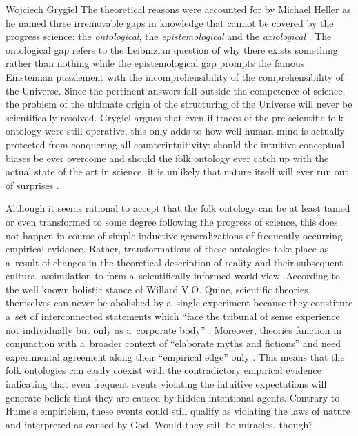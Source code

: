 \begin{artengenv}{Wojciech Grygiel}
The theoretical reasons were accounted for by Michael Heller as he named three irremovable gaps in knowledge that cannot be covered by the progress science: the \textit{ontological}, the \textit{epistemological} and the \textit{axiological}
\parencite[][pp.142–143]{heller_chaos_2003}. %
 The ontological gap refers to the Leibnizian question of why there exists something rather than nothing while the epistemological gap prompts the famous Einsteinian puzzlement with the incomprehensibility of the comprehensibility of the Universe. Since the pertinent answers fall outside the competence of science, the problem of the ultimate origin of the structuring of the Universe will never be scientifically resolved. Grygiel argues that even if traces of the pre-scientific folk ontology were still operative, this only adds to how well human mind is actually protected from conquering all counterintuitivity: should the intuitive conceptual biases be ever overcome and should the folk ontology ever catch up with the actual state of the art in science, it is unlikely that nature itself will ever run out of surprises 
\parencite[][]{grygiel_science_2017}.%


Although it seems rational to accept that the folk ontology can be at least tamed or even transformed to some degree following the progress of science, this does not happen in course of simple inductive generalizations of frequently occurring empirical evidence. Rather, transformations of these ontologies take place as a~result of changes in the theoretical description of reality and their subsequent cultural assimilation to form a~scientifically informed world view. According to the well known holistic stance of Willard V.O. Quine, scientific theories themselves can never be abolished by a~single experiment because they constitute a~set of interconnected statements which ``face the tribunal of sense experience not individually but only as a~corporate body''
\parencite[][p.30]{Quine1951-QUITDO-3}. %
 Moreover, theories function in conjunction with a~broader context of ``elaborate myths and fictions'' and need experimental agreement along their ``empirical edge'' only 
\parencite[][p.42]{Quine1951-QUITDO-3}. %
 This means that the folk ontologies can easily coexist with the contradictory empirical evidence indicating that even frequent events violating the intuitive expectations will generate beliefs that they are caused by hidden intentional agents. Contrary to Hume’s empiricism, these events could still qualify as violating the laws of nature and interpreted as caused by God. Would they still be miracles, though?


\end{artengenv}
